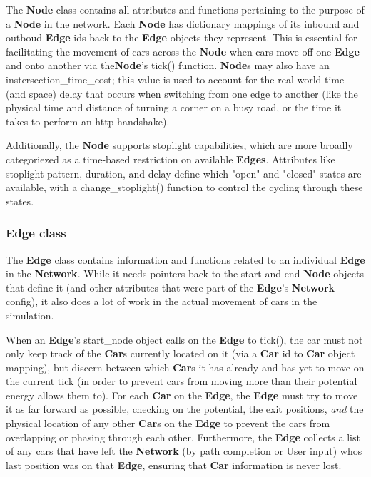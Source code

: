 \par The \textbf{Node} class contains all attributes and functions pertaining to the purpose of a \textbf{Node} in the network.  Each \textbf{Node} has dictionary mappings of its inbound and outboud \textbf{Edge} ids back to the \textbf{Edge} objects they represent.  This is essential for facilitating the movement of cars across the \textbf{Node} when cars move off one \textbf{Edge} and onto another via the\textbf{Node}'s tick() function. \textbf{Node}s may also have an instersection\_time\_cost; this value is used to account for the real-world time (and space) delay that occurs when switching from one edge to another (like the physical time and distance of turning a corner on a busy road, or the time it takes to perform an http handshake). \\

\par  Additionally, the \textbf{Node} supports stoplight capabilities, which are more broadly categoriezed as a time-based restriction on available \textbf{Edges}.  Attributes like stoplight pattern, duration, and delay define which "open" and "closed" states are available, with a change\_stoplight() function to control the cycling through these states. \\

\subsubsection{Edge class}

\par The \textbf{Edge} class contains information and functions related to an individual \textbf{Edge} in the \textbf{Network}.  While it needs pointers back to the start and end \textbf{Node} objects that define it (and other attributes that were part of the \textbf{Edge}'s \textbf{Network} config), it also does a lot of work in the actual movement of cars in the simulation. \\

\par When an \textbf{Edge}'s start\_node object calls on the \textbf{Edge} to tick(), the car must not only keep track of the \textbf{Car}s currently located on it (via a \textbf{Car} id to \textbf{Car} object mapping), but discern between which \textbf{Car}s it has already and has yet to move on the current tick (in order to prevent cars from moving more than their potential energy allows them to).  For each \textbf{Car} on the \textbf{Edge}, the \textbf{Edge} must try to move it as far forward as possible, checking on the potential, the exit positions, \textit{and} the physical location of any other \textbf{Car}s on the \textbf{Edge} to prevent the cars from overlapping or phasing through each other. Furthermore, the \textbf{Edge} collects a list of any cars that have left the \textbf{Network} (by path completion or User input) whos last position was on that \textbf{Edge}, ensuring that \textbf{Car} information is never lost.\\


